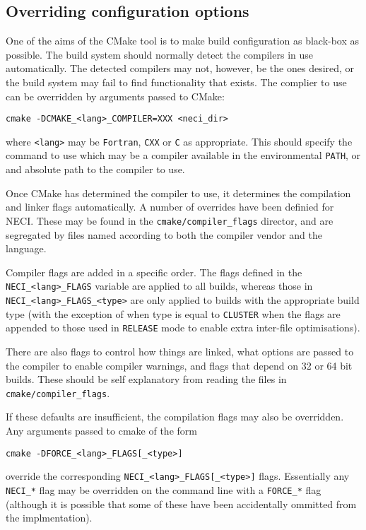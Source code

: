 \documentclass[a4paper,notitlepage]{scrreprt}
\let\code\lstinline
\begin{document}
\subsection{Overriding configuration options}

    One of the aims of the CMake tool is to make build configuration as black-box as possible.
    The build system should normally detect the compilers in use automatically. The detected compilers
    may not, however, be the ones desired, or the build system may fail to find functionality that
    exists. The complier to use can be overridden by arguments passed to CMake:
    \begin{lstlisting}[gobble=4]
        cmake -DCMAKE_<lang>_COMPILER=XXX <neci_dir>
    \end{lstlisting}
    where \code{<lang>} may be \code{Fortran}, \code{CXX} or \code{C} as appropriate. This should
    specify the command to use which may be a compiler available in the environmental \code{PATH},
    or and absolute path to the compiler to use.

    Once CMake has determined the compiler to use, it determines the compilation and linker flags
    automatically. A number of overrides have been definied for NECI. These may be found in the
    \code{cmake/compiler_flags} director, and are segregated by files named according to both the
    compiler vendor and the language.

    Compiler flags are added in a specific order. The flags defined in the \code{NECI_<lang>_FLAGS}
    variable are applied to all builds, whereas those in \code{NECI_<lang>_FLAGS_<type>} are only
    applied to builds with the appropriate build type (with the exception of when type is equal to
    \code{CLUSTER} when the flags are appended to those used in \code{RELEASE} mode to enable
    extra inter-file optimisations).

    There are also flags to control how things are linked, what options are passed to the compiler
    to enable compiler warnings, and flags that depend on 32 or 64 bit builds. These should be
    self explanatory from reading the files in \code{cmake/compiler_flags}.

    If these defaults are insufficient, the compilation flags may also be overridden. Any arguments
    passed to cmake of the form
    \begin{lstlisting}[gobble=4]
        cmake -DFORCE_<lang>_FLAGS[_<type>]
    \end{lstlisting}
    override the corresponding \code{NECI_<lang>_FLAGS[_<type>]} flags. Essentially any
    \code{NECI_*} flag may be overridden on the command line with a \code{FORCE_*} flag (although
    it is possible that some of these have been accidentally ommitted from the implmentation).
\end{document}
